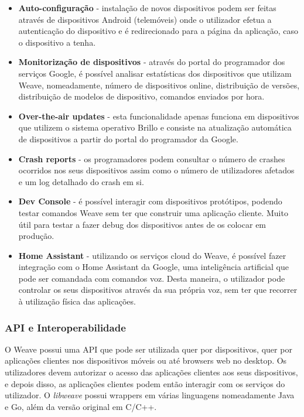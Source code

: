 \begin{itemize}

\item \textbf{Auto-configuração} - instalação de novos dispositivos podem ser feitas através de dispositivos Android (telemóveis) onde o utilizador efetua a autenticação do dispositivo e é redirecionado para a página da aplicação, caso o dispositivo a tenha.
    
\item \textbf{Monitorização de dispositivos} - através do portal do programador dos serviços Google, é possível analisar estatísticas dos dispositivos que utilizam Weave, nomeadamente, número de dispositivos online, distribuição de versões, distribuição de modelos de dispositivo, comandos enviados por hora.
    
\item \textbf{Over-the-air updates} - esta funcionalidade apenas funciona em dispositivos que utilizem o sistema operativo Brillo e consiste na atualização automática de dispositivos a partir do portal do programador da Google.
   
\item \textbf{Crash reports} - os programadores podem consultar o número de crashes ocorridos nos seus dispositivos assim como o número de utilizadores afetados e um log detalhado do crash em si.
    
\item \textbf{Dev Console} - é possível interagir com dispositivos protótipos, podendo testar comandos Weave sem ter que construir uma aplicação cliente. Muito útil para testar a fazer debug dos dispositivos antes de os colocar em produção.

\item \textbf{Home Assistant} - utilizando os serviços cloud do Weave, é possível fazer integração com o Home Assistant da Google, uma inteligência artificial que pode ser comandada com comandos voz. Desta maneira, o utilizador pode controlar os seus dispositivos através da sua própria voz, sem ter que recorrer à utilização física das aplicações.
\end{itemize}


\subsubsection{API e Interoperabilidade}

O Weave possui uma API que pode ser utilizada quer por dispositivos, quer por aplicações clientes nos dispositivos móveis ou até browsers web no desktop. Os utilizadores devem autorizar o acesso das aplicações clientes aos seus dispositivos, e depois disso, as aplicações clientes podem então interagir com os serviços do utilizador. O \textit{libweave} possui wrappers em várias linguagens nomeadamente Java e Go, além da versão original em C/C++.

